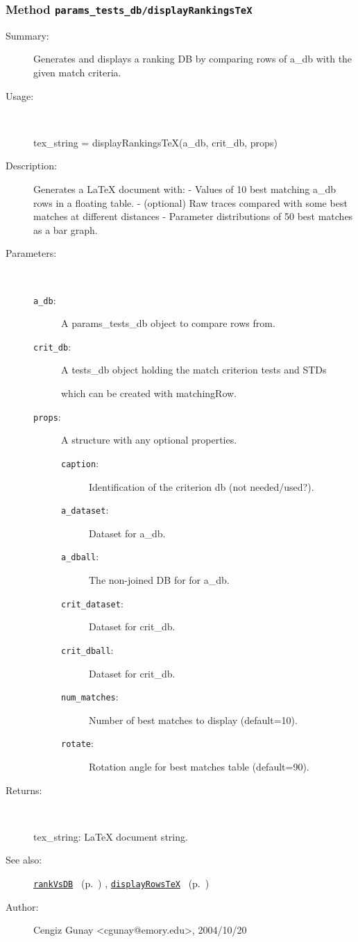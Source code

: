 \subsubsection[Method \texttt{displayRankingsTeX}]{Method \texttt{params\_tests\_db/displayRankingsTeX}}%
%
\label{ref_params_tests_db__displayRankingsTeX}%
\hypertarget{ref_params_tests_db__displayRankingsTeX}{}%
\begin{description}
\item[Summary:]Generates and displays a ranking DB by comparing rows of a\_db with the given match criteria.
%
\item[Usage:]~%
\begin{lyxcode}%
tex\_string = displayRankingsTeX(a\_db, crit\_db, props)
%
\end{lyxcode}%
%
\item[Description:]%
Generates a LaTeX document with:
	- Values of 10 best matching a\_db rows in a floating table.
	- (optional) Raw traces compared with some best matches at different distances
	- Parameter distributions of 50 best matches as a bar graph.
\item[Parameters:]~
\begin{description}%
\item[\texttt{a\_db}:]
 A params\_tests\_db object to compare rows from.
\item[\texttt{crit\_db}:]
 A tests\_db object holding the match criterion tests and STDs

which can be created with matchingRow.
\item[\texttt{props}:]
 A structure with any optional properties.
\begin{description}%
\item[\texttt{caption}:]
 Identification of the criterion db (not needed/used?).
\item[\texttt{a\_dataset}:]
 Dataset for a\_db.
\item[\texttt{a\_dball}:]
 The non-joined DB for for a\_db.
\item[\texttt{crit\_dataset}:]
 Dataset for crit\_db.
\item[\texttt{crit\_dball}:]
 Dataset for crit\_db.
\item[\texttt{num\_matches}:]
 Number of best matches to display (default=10).
\item[\texttt{rotate}:]
 Rotation angle for best matches table (default=90).
\end{description}%
\end{description}%
%
\item[Returns:
]~

	tex\_string: LaTeX document string.
%
%
\item[See also:]%
\hyperlink{ref_rankVsDB}{\texttt{rankVsDB}}%
\ (p.~\pageref{ref_rankVsDB})%
%
, \hyperlink{ref_displayRowsTeX}{\texttt{displayRowsTeX}}%
\ (p.~\pageref{ref_displayRowsTeX})%
%
%
\item[Author:]%
Cengiz Gunay <cgunay@emory.edu>, 2004/10/20
%
\end{description}
\methodline%
